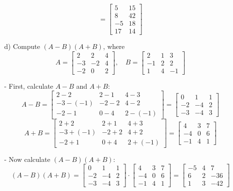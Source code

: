 \begin{sol}
\begin{enumerate}
          \[
          = \begin{bmatrix} 5 & 15 \\ 8 & 42 \\ -5 & 18 \\ 17 & 14 \end{bmatrix}
          \]

        \item[d)] Compute $(A - B)(A + B)$, where 
        \[
        A = \begin{bmatrix} 2 & 2 & 4 \\ -3 & -2 & 4 \\ -2 & 0 & 2 \end{bmatrix}, \quad B = \begin{bmatrix} 2 & 1 & 3 \\ -1 & 2 & 2 \\ 1 & 4 & -1 \end{bmatrix}
        \]

        - First, calculate $A - B$ and $A + B$:
          \[
          A - B = \begin{bmatrix} 2 - 2 & 2 - 1 & 4 - 3 \\ -3 - (-1) & -2 - 2 & 4 - 2 \\ -2 - 1 & 0 - 4 & 2 - (-1) \end{bmatrix} = \begin{bmatrix} 0 & 1 & 1 \\ -2 & -4 & 2 \\ -3 & -4 & 3 \end{bmatrix}
          \]
          \[
          A + B = \begin{bmatrix} 2 + 2 & 2 + 1 & 4 + 3 \\ -3 + (-1) & -2 + 2 & 4 + 2 \\ -2 + 1 & 0 + 4 & 2 + (-1) \end{bmatrix} = \begin{bmatrix} 4 & 3 & 7 \\ -4 & 0 & 6 \\ -1 & 4 & 1 \end{bmatrix}
          \]

        - Now calculate $(A - B)(A + B)$:
          \[
          (A - B)(A + B) = \begin{bmatrix} 0 & 1 & 1 \\ -2 & -4 & 2 \\ -3 & -4 & 3 \end{bmatrix} \cdot \begin{bmatrix} 4 & 3 & 7 \\ -4 & 0 & 6 \\ -1 & 4 & 1 \end{bmatrix} 
          = \begin{bmatrix} -5 & 4 & 7 \\ 6 & 2 & -36 \\ 1 & 3 & -42 \end{bmatrix}
          \]
          

\end{enumerate}
\end{sol}
